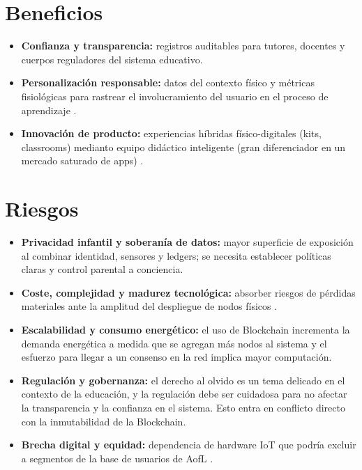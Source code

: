 \documentclass[conference]{IEEEtran}
\begin{document}
\section{Beneficios}
\begin{itemize}
    \item \textbf{Confianza y transparencia:} registros auditables para tutores, docentes y cuerpos reguladores del sistema educativo.
    \item \textbf{Personalización responsable:} datos del contexto físico y métricas fisiológicas para rastrear el involucramiento del usuario en el proceso de aprendizaje \cite{kulkarni2025edtech}.
    \item \textbf{Innovación de producto:} experiencias híbridas físico-digitales (kits, classrooms) medianto equipo didáctico inteligente (gran diferenciador en un mercado saturado de apps) \cite{hoe2022digital}.
\end{itemize}

\section{Riesgos}
\begin{itemize}
    \item \textbf{Privacidad infantil y soberanía de datos:} mayor superficie de exposición al combinar identidad, sensores y ledgers; se necesita establecer políticas claras y control parental a conciencia.
    \item \textbf{Coste, complejidad y madurez tecnológica:} absorber riesgos de pérdidas materiales ante la amplitud del despliegue de nodos físicos \cite{hoe2022digital}.
    \item \textbf{Escalabilidad y consumo energético:} el uso de Blockchain incrementa la demanda energética a medida que se agregan más nodos al sistema y el esfuerzo para llegar a un consenso en la red implica mayor computación.
    \item \textbf{Regulación y gobernanza:} el derecho al olvido es un tema delicado en el contexto de la educación, y la regulación debe ser cuidadosa para no afectar la transparencia y la confianza en el sistema. Esto entra en conflicto directo con la inmutabilidad de la Blockchain.
    \item \textbf{Brecha digital y equidad:} dependencia de hardware IoT que podría excluir a segmentos de la base de usuarios de AofL \cite{kulkarni2025edtech}.
\end{itemize}
\end{document}
